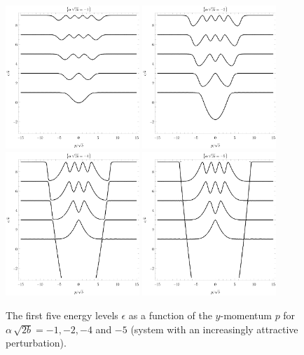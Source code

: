 \begin{figure}[p]
    \centering
    \noindent
    \includegraphics[width=0.45\textwidth]{grafy/dirac-1.pdf}%
    \hspace{0.1\textwidth}%
    \includegraphics[width=0.45\textwidth]{grafy/dirac-2.pdf}%
    \\[2em]%
    \includegraphics[width=0.45\textwidth]{grafy/dirac-4.pdf}%
    \hspace{0.1\textwidth}%
    \includegraphics[width=0.45\textwidth]{grafy/dirac-5.pdf}\par
    \caption{The first five energy levels $\epsilon$ as a function of the $y$-momentum $p$ for $\alpha\,\sqrt{2b} = -1, -2, -4$ and $-5$ (system with an increasingly attractive perturbation).}
    \label{plots-dirac-attractive}
\end{figure}
